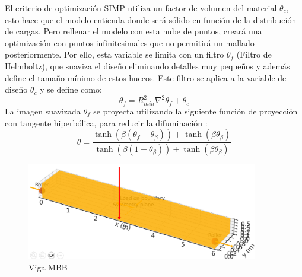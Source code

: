 \documentclass{article}
\theoremstyle{mytheoremstyle}
\theoremstyle{mytheoremstyle}
\theoremstyle{myproblemstyle}
\begin{document}
       El criterio de optimización SIMP utiliza un factor de volumen del material $\theta_c$, esto hace que el modelo entienda donde será sólido en función de la distribución de cargas. Pero rellenar el modelo con esta nube de puntos, creará una optimización con puntos infinitesimales que no permitirá un mallado posteriormente. Por ello, esta variable se limita con un filtro $\theta_f$ (Filtro de Helmholtz), que suaviza el diseño eliminando detalles muy pequeños y además define el tamaño mínimo de estos huecos. Este filtro se aplica a la variable de diseño $\theta_c$ y se define como: 
        \begin{equation}
                \theta_f = R_{min}^2 \nabla^2 \theta_f + \theta_c
                \label{eq:filtro_helmholtz}
             \end{equation}
             La imagen suavizada $\theta_f$ se proyecta utilizando la siguiente función de proyección con tangente hiperbólica, para reducir la difuminación :
             \begin{equation}
             \theta = \frac{\tanh(\beta(\theta_f - \theta_\beta)) + \tanh(\beta\theta_\beta)}{\tanh(\beta(1 - \theta_\beta)) + \tanh(\beta\theta_\beta)}
             \end{equation}
            \begin{figure}[H]
              \centering
              \includegraphics[width=0.9\textwidth]{2.png}
              \caption{Viga MBB}
              \label{fig:viga_mbb_ejemplo}
            \end{figure}
\end{document}
